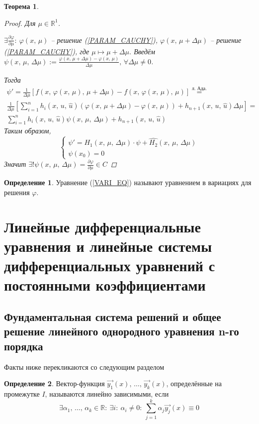 \documentclass[a4paper,12pt]{article}
\renewcommand{\phi}{\ensuremath{\varphi}}
\theoremstyle{plain}
\newtheorem{theorem}{Теорема}[section]
\theoremstyle{definition}
\newtheorem{definition}{Определение}[section]
\theoremstyle{remark}
\begin{document}
\begin{theorem}
	\begin{proof}
		Для $\mu \in \mathbb{R}^1$.

		$\exists \frac{\partial \phi}{\partial \mu}:\: \phi(x,\,\mu)$ -- решение (\ref*{PARAM_CAUCHY}), $\phi(x,\, \mu + \Delta\mu)$ -- решение (\ref*{PARAM_CAUCHY}), где $\mu \mapsto \mu + \Delta\mu$. Введём $\psi(x,\,\mu,\,\Delta\mu) := \frac{\phi(x,\, \mu + \Delta\mu) - \phi(x,\, \mu)}{\Delta\mu},\, \forall \Delta\mu \neq 0$.

		Тогда
		\begin{align*}
			\psi' = \frac{1}{\Delta\mu}\left[f(x,\, \phi(x,\, \mu),\, \mu + \Delta\mu) - f(x,\,\phi(x,\, \mu),\, \mu)\right] \overset{\text{л. Ада.}}{=}            \\
			\frac{1}{\Delta\mu}\left[\sum_{i=1}^n h_i(x,\, u,\,\hat{u})(\phi(x,\, \mu + \Delta\mu) - \phi(x,\, \mu)) + h_{n + 1}(x,\,u,\,\hat{u})\Delta\mu\right] = \\
			\sum_{i = 1}^n h_i(x,\,u,\,\hat{u})\psi(x,\,\mu,\,\Delta\mu) + h_{n + 1}(x,\,u,\,\hat{u})
		\end{align*}
		Таким образом,
		\begin{equation}\label{VARI_EQ}
			\begin{cases}
				\psi' = H_1(x,\,\mu,\,\Delta\mu)\cdot\psi + \hat{H_2}(x,\,\mu,\,\Delta\mu) \\
				\psi(x_0) = 0
			\end{cases}
		\end{equation}
		Значит $\exists! \psi(x,\,\mu,\, \Delta\mu) = \frac{\partial \phi}{\partial \mu} \in C$
	\end{proof}
\end{theorem}

\begin{definition}
	Уравнение (\ref*{VARI_EQ}) называют уравнением в вариациях для решения $\phi$.
\end{definition}

\section{Линейные дифференциальные уравнения и линейные системы дифференциальных уравнений с постоянными коэффициентами}
\subsection{Фундаментальная система решений и общее решение линейного однородного уравнения n-го порядка}
Факты ниже перекликаются со следующим разделом
\begin{definition}
	Вектор-функция $\vec{y_1}(x),\,\ldots,\,\vec{y_k}(x)$, определённые на промежутке $I$, называются линейно зависимыми, если
	\[\exists \alpha_1,\,\ldots,\,\alpha_k \in \mathbb{R}:\: \exists i:\: \alpha_i \neq 0:\: \sum_{j = 1}^k \alpha_j \vec{y_j}(x) \equiv 0\]
\end{definition}
\end{document}
